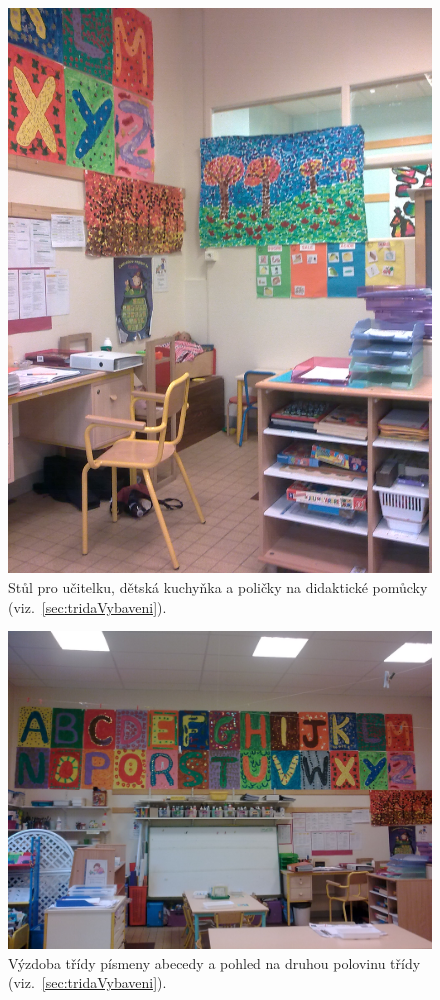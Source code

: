 	\begin{figure}[tb]
		\centering
		\includegraphics[height = 0.35\textheight]{./fotky/Obr5.jpg}
		\caption{
			Stůl pro učitelku, dětská kuchyňka a poličky na didaktické pomůcky (viz.~\ref{sec:tridaVybaveni}).
		}
		\label{Obr5}
	\end{figure}

	\begin{figure}[tb]
		\centering
		\includegraphics[height = 0.35\textheight]{./fotky/Obr6.jpg}
		\caption{
			Výzdoba třídy písmeny abecedy a pohled na druhou polovinu třídy (viz.~\ref{sec:tridaVybaveni}).
		}
		\label{Obr6}
	\end{figure}


